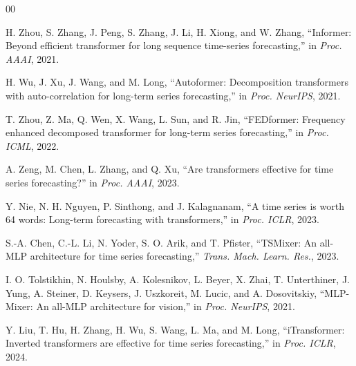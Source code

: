 \documentclass[conference]{IEEEtran}
\begin{document}
\begin{thebibliography}{00}

H. Zhou, S. Zhang, J. Peng, S. Zhang, J. Li, H. Xiong, and W. Zhang,
``Informer: Beyond efficient transformer for long sequence time-series
forecasting,'' in \emph{Proc. AAAI}, 2021.

H. Wu, J. Xu, J. Wang, and M. Long, ``Autoformer: Decomposition transformers
with auto-correlation for long-term series forecasting,'' in \emph{Proc.
NeurIPS}, 2021.

T. Zhou, Z. Ma, Q. Wen, X. Wang, L. Sun, and R. Jin, ``FEDformer: Frequency
enhanced decomposed transformer for long-term series forecasting,'' in
\emph{Proc. ICML}, 2022.

A. Zeng, M. Chen, L. Zhang, and Q. Xu, ``Are transformers effective for time
series forecasting?'' in \emph{Proc. AAAI}, 2023.

Y. Nie, N. H. Nguyen, P. Sinthong, and J. Kalagnanam, ``A time series is
worth 64 words: Long-term forecasting with transformers,'' in \emph{Proc.
ICLR}, 2023.

S.-A. Chen, C.-L. Li, N. Yoder, S. O. Arik, and T. Pfister, ``TSMixer: An
all-MLP architecture for time series forecasting,'' \emph{Trans. Mach.
Learn. Res.}, 2023.

I. O. Tolstikhin, N. Houlsby, A. Kolesnikov, L. Beyer, X. Zhai, T. Unterthiner,
J. Yung, A. Steiner, D. Keysers, J. Uszkoreit, M. Lucic, and A. Dosovitskiy,
``MLP-Mixer: An all-MLP architecture for vision,'' in \emph{Proc. NeurIPS},
2021.

Y. Liu, T. Hu, H. Zhang, H. Wu, S. Wang, L. Ma, and M. Long, ``iTransformer:
Inverted transformers are effective for time series forecasting,'' in
\emph{Proc. ICLR}, 2024.

\end{thebibliography}
\end{document}
